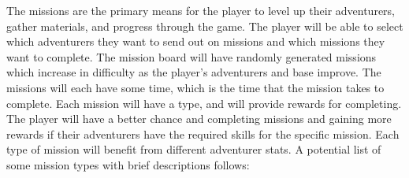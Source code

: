 The missions are the primary means for the player to level up their adventurers, gather materials, and progress through the game. The player will be able to select which adventurers they want to send out on missions and which missions they want to complete. The mission board will have randomly generated missions which increase in difficulty as the player's adventurers and base improve. The missions will each have some time, which is the time that the mission takes to complete. Each mission will have a type, and will provide rewards for completing. The player will have a better chance and completing missions and gaining more rewards if their adventurers have the required skills for the specific mission. Each type of mission will benefit from different adventurer stats. A potential list of some mission types with brief descriptions follows:


